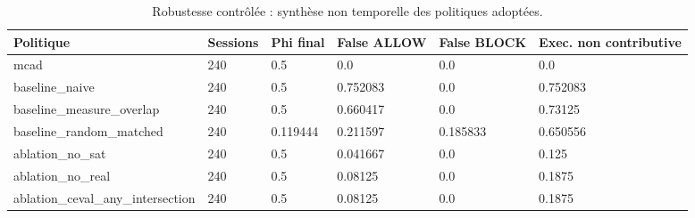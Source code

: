 \begin{table}[t]
\centering
\caption{Robustesse contrôlée : synthèse non temporelle des politiques adoptées.}
\label{tab:v3-robustness-main}
\small
\begin{tabular}{p{}p{}p{}p{}p{}p{}}
\hline
Politique & Sessions & Phi final & False ALLOW & False BLOCK & Exec. non contributive \\
\hline
mcad & 240 & 0.5 & 0.0 & 0.0 & 0.0 \\
baseline\_naive & 240 & 0.5 & 0.752083 & 0.0 & 0.752083 \\
baseline\_measure\_overlap & 240 & 0.5 & 0.660417 & 0.0 & 0.73125 \\
baseline\_random\_matched & 240 & 0.119444 & 0.211597 & 0.185833 & 0.650556 \\
ablation\_no\_sat & 240 & 0.5 & 0.041667 & 0.0 & 0.125 \\
ablation\_no\_real & 240 & 0.5 & 0.08125 & 0.0 & 0.1875 \\
ablation\_ceval\_any\_intersection & 240 & 0.5 & 0.08125 & 0.0 & 0.1875 \\
\hline
\end{tabular}
\end{table}
